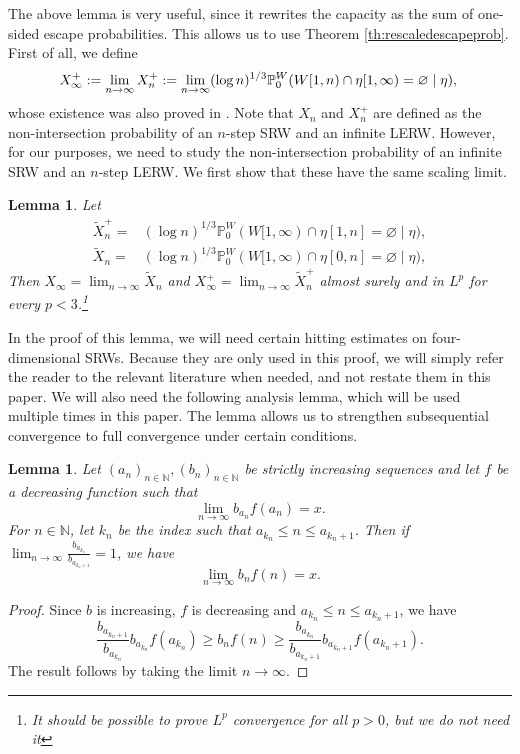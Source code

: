 \documentclass{article}
\newcommand{\N}{\mathbb{N}}
\renewcommand{\P}{\mathbb{P}}
\newcommand{\1}{\mathbf{1}}
\newcommand{\limn}{\lim_{n\rightarrow\infty}}
\newtheorem{lemma}[theorem]{Lemma}
\theoremstyle{definition}
\numberwithin{equation}{section}
\numberwithin{theorem}{section}
\begin{document}
The above lemma is very useful, since it rewrites the capacity as the sum of one-sided escape probabilities. This allows us to use Theorem \ref{th:rescaledescapeprob}. First of all, we define
\begin{equation}
	X^+_\infty:=\limn X^+_n:=\limn(\log n)^{1/3}\P^W_0(W[1,n)\cap\eta[1,\infty)=\varnothing\mid\eta),\\
\end{equation}
whose existence was also proved in \cite{lawler19fourdimensional}. Note that $X_n$ and $X^+_n$ are defined as the non-intersection probability of an $n$-step SRW and an infinite LERW. However, for our purposes, we need to study the non-intersection probability of an infinite SRW and an $n$-step LERW. We first show that these have the same scaling limit.
\begin{lemma}\label{lem:convergenceXtilde}
Let 
\begin{equation}
    \begin{split}
        \widetilde{X}^+_n=&(\log n)^{1/3}\P_0^W(W[1,\infty)\cap\eta[1,n]=\varnothing\mid \eta),\\
        \widetilde{X}_n=&(\log n)^{1/3}\P_0^W(W[1,\infty)\cap\eta[0,n]=\varnothing\mid \eta),
    \end{split}
\end{equation}
Then $X_\infty=\limn \widetilde{X}_n$ and $X_\infty^+=\limn\widetilde{X}_n^+$ almost surely and in $L^p$ for every $p<3$.\footnote{It should be possible to prove $L^p$ convergence for all $p>0$, but we do not need it}
\end{lemma}
In the proof of this lemma, we will need certain hitting estimates on four-dimensional SRWs. Because they are only used in this proof, we will simply refer the reader to the relevant literature when needed, and not restate them in this paper. We will also need the following analysis lemma, which will be used multiple times in this paper. The lemma allows us to strengthen subsequential convergence to full convergence under certain conditions.
\begin{lemma}\label{lem:subseqconv}
Let $(a_n)_{n\in\N},(b_n)_{n\in\N}$ be strictly increasing sequences and let $f$ be a decreasing function such that
\begin{equation}
	\limn b_{a_n}f(a_n)=x.
\end{equation}
For $n\in\N$, let $k_n$ be the index such that $a_{k_n}\leq n\leq a_{k_{n}+1}$. Then if $\limn\frac{b_{a_{k_n}}}{b_{a_{k_n+1}}}=1$, we have
\begin{equation}
	\limn b_n f(n)=x.
\end{equation}
\end{lemma}
\begin{proof}
Since $b$ is increasing, $f$ is decreasing and $a_{k_n}\leq n\leq a_{k_n+1}$, we have
\begin{equation}
	\frac{b_{a_{k_n+1}}}{b_{a_{k_n}}}b_{a_{k_n}}f(a_{k_n})\geq b_nf(n)\geq\frac{b_{a_{k_n}}}{b_{a_{k_n+1}}}b_{a_{k_n+1}}f(a_{k_n+1}).
\end{equation}
The result follows by taking the limit $n\rightarrow\infty$.
\end{proof}
\end{document}
